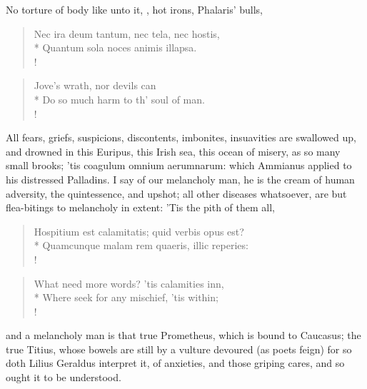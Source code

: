 No torture of body like unto it, , hot irons, Phalaris' bulls,

\begin{latin}
\begin{verse}%
Nec ira deum tantum, nec tela, nec hostis,\\*
Quantum sola noces animis illapsa.\\!
\end{verse}%
\end{latin}
\translationrule%
\begin{verse}%
Jove's wrath, nor devils can\\*
Do so much harm to th' soul of man.\\!
\end{verse}%
%

All fears, griefs, suspicions, discontents, imbonites, insuavities are
swallowed up, and drowned in this Euripus, this Irish sea, this ocean
of misery, as so many small brooks; 'tis coagulum omnium aerumnarum:
which Ammianus applied to his distressed Palladins. I say of our
melancholy man, he is the cream of human adversity, the 
quintessence, and upshot; all other diseases whatsoever, are but
flea-bitings to melancholy in extent: 'Tis the pith of them all,
%
\begin{latin}
\begin{verse}%
Hospitium est calamitatis; quid verbis opus est?\\*
Quamcunque malam rem quaeris, illic reperies:\\!
\end{verse}%
\end{latin}
\translationrule%
\begin{verse}%
What need more words? 'tis calamities inn,\\*
Where seek for any mischief, 'tis within;\\!
\end{verse}%
%
%
and a melancholy man is that true Prometheus, which is bound to
Caucasus; the true Titius, whose bowels are still by a vulture devoured
(as poets feign) for so doth Lilius Geraldus interpret it, of
anxieties, and those griping cares, and so ought it to be understood.

